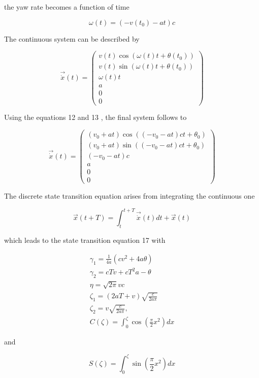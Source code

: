 the yaw rate becomes a function of time

$$
\omega(t)=\left(-v\left(t_{0}\right)-a t\right) c
$$

The continuous system can be described by

$$
\overrightarrow{\dot{x}}(t)=\left(\begin{array}{c}
	v(t) \cos \left(\omega(t) t+\theta\left(t_{0}\right)\right) \\
	v(t) \sin \left(\omega(t) t+\theta\left(t_{0}\right)\right) \\
	\omega(t) t \\
	a \\
	0 \\
	0
\end{array}\right)
$$

Using the equations 12 and 13 , the final system follows to

$$
\overrightarrow{\dot{x}}(t)=\left(\begin{array}{c}
	\left(v_{0}+a t\right) \cos \left(\left(-v_{0}-a t\right) c t+\theta_{0}\right) \\
	\left(v_{0}+a t\right) \sin \left(\left(-v_{0}-a t\right) c t+\theta_{0}\right) \\
	\left(-v_{0}-a t\right) c \\
	a \\
	0 \\
	0
\end{array}\right)
$$

The discrete state transition equation arises from integrating the continuous one

$$
\vec{x}(t+T)=\int_{t}^{t+T} \overrightarrow{\dot{x}}(t) d t+\vec{x}(t)
$$

which leads to the state transition equation 17 with

$$
\begin{gathered}
	\gamma_{1}=\frac{1}{4 a}\left(c v^{2}+4 a \theta\right) \\
	\gamma_{2}=c T v+c T^{2} a-\theta \\
	\eta=\sqrt{2 \pi} v c \\
	\zeta_{1}=(2 a T+v) \sqrt{\frac{c}{2 a \pi}} \\
	\zeta_{2}=v \sqrt{\frac{c}{2 a \pi}}, \\
	C(\zeta)=\int_{0}^{\zeta} \cos \left(\frac{\pi}{2} x^{2}\right) d x
\end{gathered}
$$

and

$$
S(\zeta)=\int_{0}^{\zeta} \sin \left(\frac{\pi}{2} x^{2}\right) d x
$$

